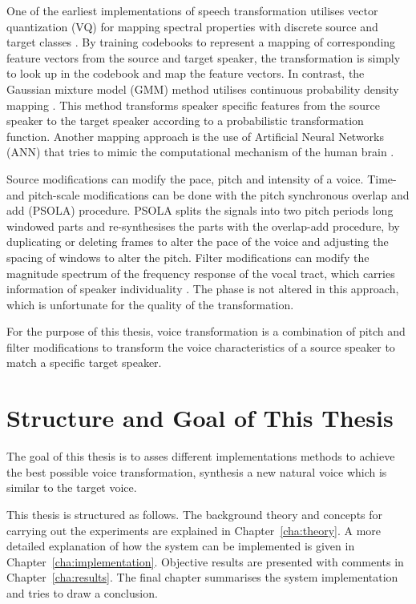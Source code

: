 One of the earliest implementations of speech transformation utilises vector quantization (VQ) for mapping spectral properties with discrete source and target classes \cite{abe88}. By training codebooks to represent a mapping of corresponding feature vectors from the source and target speaker, the transformation is simply to look up in the codebook and map the feature vectors. In contrast, the Gaussian mixture model (GMM) method utilises continuous probability density mapping \cite{stylianou98}. This method transforms speaker specific features from the source speaker to the target speaker according to a probabilistic transformation function. Another mapping approach is the use of Artificial Neural Networks (ANN) that tries to mimic the computational mechanism of the human brain \cite{desai09,young75}. 

Source modifications can modify the pace, pitch and intensity of a voice. Time- and pitch-scale modifications can be done with the pitch synchronous overlap and add (PSOLA) procedure. PSOLA splits the signals into two pitch periods long windowed parts and re-synthesises the parts with the overlap-add procedure, by duplicating or deleting frames to alter the pace of the voice and adjusting the spacing of windows to alter the pitch. Filter modifications can modify the magnitude spectrum of the frequency response of the vocal tract, which carries information of speaker individuality \cite{stylianou09,nguyen09}. The phase is not altered in this approach, which is unfortunate for the quality of the transformation.

For the purpose of this thesis, voice transformation is a combination of pitch and filter modifications to transform the voice characteristics of a source speaker to match a specific target speaker. 

\section{Structure and Goal of This Thesis} %
\label{sec:structure_and_goal_of_this_thesis}
The goal of this thesis is to asses different implementations methods to achieve the best possible voice transformation, \ie synthesis a new natural voice which is similar to the target voice. 

This thesis is structured as follows. The background theory and concepts for carrying out the experiments are explained in Chapter~\ref{cha:theory}. A more detailed explanation of how the system can be implemented is given in Chapter~\ref{cha:implementation}. Objective results are presented with comments in Chapter~\ref{cha:results}. The final chapter summarises the system implementation and tries to draw a conclusion.

